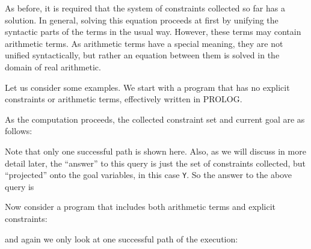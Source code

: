 As before, it is required that the system of constraints collected 
so far has a solution.
In general, solving this equation proceeds at first by unifying the
syntactic parts of the terms in the usual way. However, these terms may
contain arithmetic terms. As arithmetic terms have a special meaning, 
they are not unified syntactically, but rather an equation between
them is solved in the domain of real arithmetic. 

Let us consider some examples. 
We start with a program that has no explicit
constraints or arithmetic terms, effectively written in PROLOG.


As the computation proceeds, the collected constraint set and current goal
are as follows:


\noindent
Note that only one successful path is shown here. 
Also, as we will discuss in more detail later, the ``answer'' 
to this query is just the set of constraints
collected, but ``projected'' onto the goal variables, in this case {\tt Y}. 
So the answer to the above query is 


\noindent
Now consider a program that includes both arithmetic terms
and explicit constraints:


\noindent
and again we only look at one successful path of the execution:


